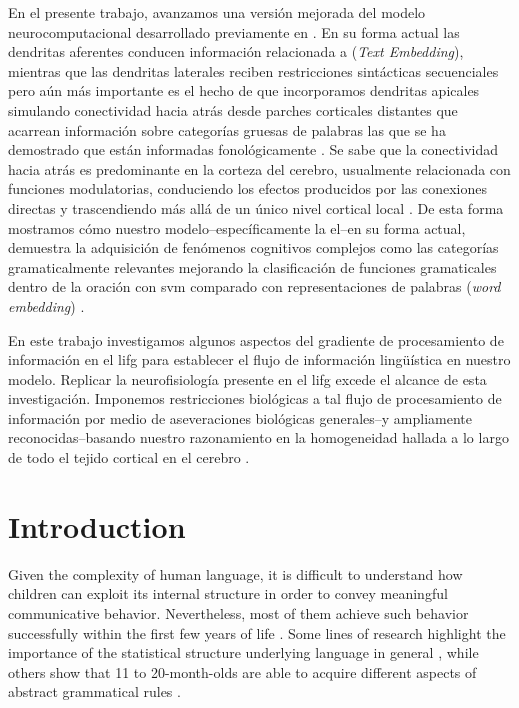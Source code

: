 {En el presente trabajo, avanzamos una versión mejorada del modelo neurocomputacional desarrollado previamente en \cite{10.1371/journal.pone.0217966}.
En su forma actual las dendritas aferentes conducen información relacionada a  (\emph{Text Embedding}), mientras que las dendritas laterales reciben restricciones sintácticas secuenciales pero aún más importante es el hecho de que incorporamos dendritas apicales simulando conectividad hacia atrás desde parches corticales distantes que acarrean información sobre categorías gruesas de palabras las que se ha demostrado que están informadas fonológicamente \cite{doi:10.1207/s15327078in1002_5, lohmann_phonological_2017}.
Se sabe que la conectividad hacia atrás es predominante en la corteza del cerebro, usualmente relacionada con funciones modulatorias, conduciendo los efectos producidos por las conexiones directas y trascendiendo más allá de un único nivel cortical local \cite{news_hidden_2018, marques_functional_2018, Chen2009ForwardAB}.
De esta forma mostramos cómo nuestro modelo--específicamente la \gls{el}--en su forma actual, demuestra la adquisición de fenómenos cognitivos complejos como las categorías gramaticalmente relevantes mejorando la clasificación de funciones gramaticales dentro de la oración con \gls{svm} comparado con representaciones de palabras (\emph{word embedding}) \cite{Mikolov:2013:DRW:2999792.2999959, mikolov2013linguistic, journals/corr/abs-1301-3781}.

En este trabajo investigamos algunos aspectos del gradiente de procesamiento de información en el \gls{lifg} para establecer el flujo de información lingüística en nuestro modelo.
Replicar la neurofisiología presente en el \gls{lifg} excede el alcance de esta investigación.
Imponemos restricciones biológicas a tal flujo de procesamiento de información por medio de aseveraciones biológicas generales--y ampliamente reconocidas--basando nuestro razonamiento en la homogeneidad hallada a lo largo de todo el tejido cortical en el cerebro \cite{Carlo1488}.
}{
\section{Introduction}

Given the complexity of human language, it is difficult to understand how children can exploit its internal structure in order to convey meaningful communicative behavior. Nevertheless, most of them achieve such behavior successfully within the first few years of life \cite{Saffran12874}. Some lines of research highlight the importance of the statistical structure underlying language in general \cite{Romberg2010StatisticalLA, 10.1371/journal.pone.0177794}, while others show that 11 to 20-month-olds are able to acquire different aspects of abstract grammatical rules \cite{doi:10.1111/infa.12094, doi:10.1111/j.1467-8624.2012.01869.x}. 

}

